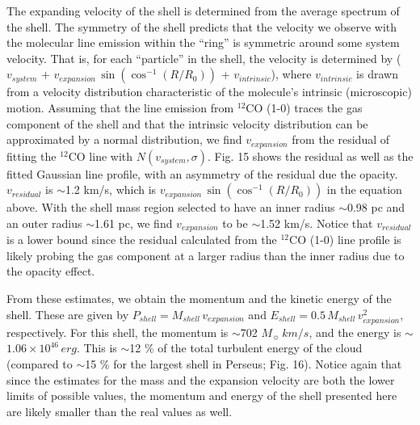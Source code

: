 \documentclass[11pt,a4paper]{emulateapj}
\begin{document}
The expanding velocity of the shell is determined from the average spectrum of the shell. The symmetry of the shell predicts that the velocity we observe with the molecular line emission within the ``ring'' is symmetric around some system velocity. That is, for each ``particle'' in the shell, the velocity is determined by ($v_{system}$ + $v_{expansion}\,\sin{\left(\cos^{-1}{\left(R/R_0\right)}\right)}$ + $v_{intrinsic}$), where $v_{intrinsic}$ is drawn from a velocity distribution characteristic of the molecule's intrinsic (microscopic) motion. Assuming that the line emission from $^{12}$CO (1-0) traces the gas component of the shell and that the intrinsic velocity distribution can be approximated by a normal distribution, we find $v_{expansion}$ from the residual of fitting the $^{12}$CO line with $N(v_{system}, \sigma)$. Fig. 15 shows the residual as well as the fitted Gaussian line profile, with an asymmetry of the residual due the opacity. $v_{residual}$ is $\sim$1.2 km/s, which is $v_{expansion}\,\sin{\left(\cos^{-1}{\left(R/R_0\right)}\right)}$ in the equation above. With the shell mass region selected to have an inner radius $\sim$0.98 pc and an outer radius $\sim$1.61 pc, we find $v_{expansion}$ to be $\sim$1.52 km/s. Notice that $v_{residual}$ is a lower bound since the residual calculated from the $^{12}$CO (1-0) line profile is likely probing the gas component at a larger radius than the inner radius due to the opacity effect.

From these estimates, we obtain the momentum and the kinetic energy of the shell. These are given by $P_{shell} = M_{shell}\,v_{expansion}$ and $E_{shell} = 0.5\,M_{shell}\,v^2_{expansion}$, respectively. For this shell, the momentum is $\sim$702 $M_{\sun}\,km/s$, and the energy is $\sim$$1.06\times10^{46}\,erg$. This is $\sim$12 \% of the total turbulent energy of the cloud (compared to $\sim$15 \% for the largest shell in Perseus; Fig. 16). Notice again that since the estimates for the mass and the expansion velocity are both the lower limits of possible values, the momentum and energy of the shell presented here are likely smaller than the real values as well.
\end{document}
